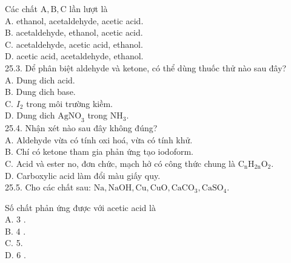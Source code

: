\documentclass[10pt]{article}
\begin{document}
Các chất $\mathrm{A}, \mathrm{B}, \mathrm{C}$ lần lượt là\\
A. ethanol, acetaldehyde, acetic acid.\\
B. acetaldehyde, ethanol, acetic acid.\\
C. acetaldehyde, acetic acid, ethanol.\\
D. acetic acid, acetaldehyde, ethanol.\\
25.3. Dể phân biệt aldehyde và ketone, có thể dùng thuốc thử nào sau đây?\\
A. Dung dich acid.\\
B. Dung dich base.\\
C. $I_{2}$ trong môi trường kiềm.\\
D. Dung dich $\mathrm{AgNO}_{3}$ trong $\mathrm{NH}_{3}$.\\
25.4. Nhận xét nào sau đây không đúng?\\
A. Aldehyde vừa có tính oxi hoá, vừa có tính khử.\\
B. Chí có ketone tham gia phản ứng tạo iodoform.\\
C. Acid và ester no, đơn chức, mạch hở có công thức chung là $\mathrm{C}_{\mathrm{n}} \mathrm{H}_{2 \mathrm{n}} \mathrm{O}_{2}$.\\
D. Carboxylic acid làm đổi màu giấy quy.\\
25.5. Cho các chất sau: $\mathrm{Na}, \mathrm{NaOH}, \mathrm{Cu}, \mathrm{CuO}, \mathrm{CaCO}_{3}, \mathrm{CaSO}_{4}$.

Số chất phản ứng được với acetic acid là\\
A. 3 .\\
B. 4 .\\
C. 5.\\
D. 6 .
\end{document}
